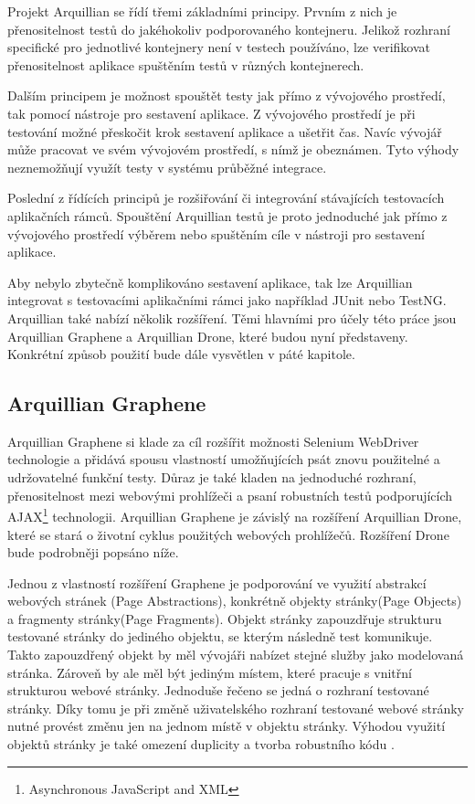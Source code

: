 \documentclass[
    color,   %
	table,   %
    twoside, %
]{fithesis3}
\begin{document}
Projekt Arquillian se řídí třemi základními principy. Prvním z nich je přenositelnost testů do jakéhokoliv podporovaného kontejneru. Jelikož rozhraní specifické pro jednotlivé kontejnery není v testech používáno, lze verifikovat přenositelnost aplikace spuštěním testů v různých kontejnerech.

Dalším principem je možnost spouštět testy jak přímo z vývojového prostředí, tak pomocí nástroje pro sestavení aplikace. Z vývojového prostředí je při testování možné přeskočit krok sestavení aplikace a ušetřit čas. Navíc vývojář může pracovat ve svém vývojovém prostředí, s nímž je obeznámen. Tyto výhody neznemožňují využít testy v systému průběžné integrace.

Poslední z řídících principů je rozšiřování či integrování stávajících testovacích aplikačních rámců. Spouštění Arquillian testů je proto jednoduché jak přímo z vývojového prostředí výběrem  nebo spuštěním cíle  v nástroji pro sestavení aplikace.

Aby nebylo zbytečně komplikováno sestavení aplikace, tak lze Arquillian integrovat s testovacími aplikačními rámci jako například JUnit nebo TestNG. Arquillian také nabízí několik rozšíření. Těmi hlavními pro účely této práce jsou Arquillian Graphene a Arquillian Drone, které budou nyní představeny. Konkrétní způsob použití bude dále vysvětlen v páté kapitole.

\subsection{Arquillian Graphene}

Arquillian Graphene si klade za cíl rozšířit možnosti Selenium WebDriver technologie a přidává spousu vlastností umožňujících psát znovu použitelné a udržovatelné funkční testy. Důraz je také kladen na jednoduché rozhraní, přenositelnost mezi webovými prohlížeči a psaní robustních testů podporujících AJAX\footnote{Asynchronous JavaScript and XML} technologii. Arquillian Graphene je závislý na rozšíření Arquillian Drone, které se stará o životní cyklus použitých webových prohlížečů. Rozšíření Drone bude podrobněji popsáno níže.

Jednou z vlastností rozšíření Graphene je podporování ve využití abstrakcí webových stránek (Page Abstractions), konkrétně objekty stránky(Page Objects) a fragmenty stránky(Page Fragments). Objekt stránky zapouzdřuje strukturu testované stránky do jediného objektu, se kterým následně test komunikuje. Takto zapouzdřený objekt by měl vývojáři nabízet stejné služby jako modelovaná stránka. Zároveň by ale měl být jediným místem, které pracuje s vnitřní strukturou webové stránky. Jednoduše řečeno se jedná o rozhraní testované stránky. Díky tomu je při změně uživatelského rozhraní testované webové stránky nutné provést změnu jen na jednom místě v objektu stránky. Výhodou využití objektů stránky je také omezení duplicity a tvorba robustního kódu \cite{Selenium}.
\end{document}
